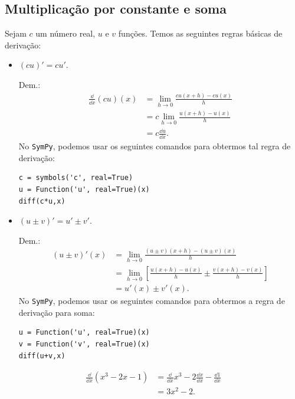 \subsection{Multiplicação por constante e soma}

Sejam $c$ um número real, $u$ e $v$ funções. Temos as seguintes regras básicas de derivação:
\begin{itemize}
\item $\displaystyle (cu)' = cu'$.

  Dem.:
  \begin{align}
    \frac{\dd}{\dd x}(cu)(x) &= \lim_{h\to 0} \frac{cu(x+h)-cu(x)}{h} \\
                          &= c\lim_{h\to 0} \frac{u(x+h)-u(x)}{h} \\
                          &= c\frac{\dd u}{\dd x}.
  \end{align}
  \ifispython
  No \verb+SymPy+, podemos usar os seguintes comandos para obtermos tal regra de derivação:
\begin{verbatim}
c = symbols('c', real=True)
u = Function('u', real=True)(x)
diff(c*u,x)
\end{verbatim}
  \fi

\item $\displaystyle (u\pm v)' = u'\pm v'$.

  Dem.:
  \begin{align}
    (u\pm v)'(x) &= \lim_{h\to 0} \frac{(u\pm v)(x+h)-(u\pm v)(x)}{h}\\
                              &= \lim_{h\to 0} \left[\frac{u(x+h)-u(x)}{h}\pm\frac{v(x+h)-v(x)}{h}\right]\\
              &= u'(x) \pm v'(x).
  \end{align}
  \ifispython
  No \verb+SymPy+, podemos usar os seguintes comandos para obtermos a regra de derivação para soma:
\begin{verbatim}
u = Function('u', real=True)(x)
v = Function('v', real=True)(x)
diff(u+v,x)
\end{verbatim}
  \fi
\end{itemize}

\begin{ex}
  \begin{align}
    \frac{\dd}{\dd x}(x^3-2x -1) &= \frac{\dd}{\dd x}x^3 -2\frac{\dd x}{\dd x} - \frac{\dd 1}{\dd x}\\
                                 &= 3x^2-2.
  \end{align}
\end{ex}

